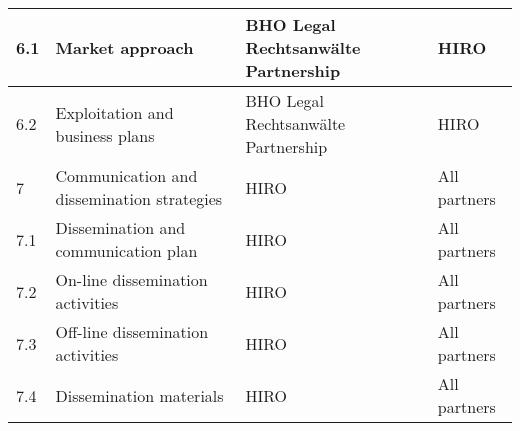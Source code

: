 \begin{longtable}[H]{l p{4cm} p{4cm} p{4cm}}
	\\ \midrule
	6.1 & Market approach &BHO Legal Rechtsanwälte Partnership&HIRO
	\\ \midrule
	6.2 & Exploitation and business plans & BHO Legal Rechtsanwälte Partnership&HIRO
	\\ \midrule
	7 & Communication and dissemination strategies &HIRO&All partners
	\\ \midrule
	7.1 & Dissemination and communication plan &HIRO&All partners
	\\ \midrule
	7.2 & On-line dissemination activities &HIRO&All partners
	\\ \midrule
	7.3 & Off-line dissemination activities &HIRO&All partners
	\\ \midrule
	7.4 & Dissemination materials & HIRO&All partners
	\\ \bottomrule[2pt]
\end{longtable}